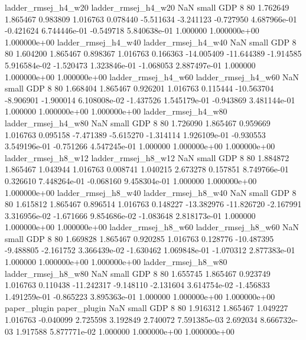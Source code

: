      ladder_rmsej_h4_w20      ladder_rmsej_h4_w20                   NaN      small      GDP                 8 80 1.762649       1.865467 0.983809       1.016763    0.078440     -5.511634     -3.241123    -0.727950   4.687966e-01 -0.421624 6.744446e-01    -0.549718   5.840638e-01            1.000000    1.000000e+00        1.000000e+00
     ladder_rmsej_h4_w40      ladder_rmsej_h4_w40                   NaN      small      GDP                 8 80 1.604200       1.865467 0.898367       1.016763    0.166363    -14.005409    -11.644389    -1.914585   5.916584e-02 -1.520473 1.323846e-01    -1.068053   2.887497e-01            1.000000    1.000000e+00        1.000000e+00
     ladder_rmsej_h4_w60      ladder_rmsej_h4_w60                   NaN      small      GDP                 8 80 1.668404       1.865467 0.926201       1.016763    0.115444    -10.563704     -8.906901    -1.900014   6.108008e-02 -1.437526 1.545179e-01    -0.943869   3.481144e-01            1.000000    1.000000e+00        1.000000e+00
     ladder_rmsej_h4_w80      ladder_rmsej_h4_w80                   NaN      small      GDP                 8 80 1.726090       1.865467 0.959669       1.016763    0.095158     -7.471389     -5.615270    -1.314114   1.926109e-01 -0.930553 3.549196e-01    -0.751266   4.547245e-01            1.000000    1.000000e+00        1.000000e+00
     ladder_rmsej_h8_w12      ladder_rmsej_h8_w12                   NaN      small      GDP                 8 80 1.884872       1.865467 1.043944       1.016763    0.008741      1.040215      2.673278     0.157851   8.749766e-01  0.326610 7.448264e-01    -0.068160   9.458304e-01            1.000000    1.000000e+00        1.000000e+00
     ladder_rmsej_h8_w40      ladder_rmsej_h8_w40                   NaN      small      GDP                 8 80 1.615812       1.865467 0.896514       1.016763    0.148227    -13.382976    -11.826720    -2.167991   3.316956e-02 -1.671666 9.854686e-02    -1.083648   2.818173e-01            1.000000    1.000000e+00        1.000000e+00
     ladder_rmsej_h8_w60      ladder_rmsej_h8_w60                   NaN      small      GDP                 8 80 1.669828       1.865467 0.920285       1.016763    0.128776    -10.487395     -9.488805    -2.161752   3.366439e-02 -1.630462 1.069848e-01    -1.070312   2.877383e-01            1.000000    1.000000e+00        1.000000e+00
     ladder_rmsej_h8_w80      ladder_rmsej_h8_w80                   NaN      small      GDP                 8 80 1.655745       1.865467 0.923749       1.016763    0.110438    -11.242317     -9.148110    -2.131604   3.614754e-02 -1.456833 1.491259e-01    -0.865223   3.895363e-01            1.000000    1.000000e+00        1.000000e+00
            paper_plugin             paper_plugin                   NaN      small      GDP                 8 80 1.916312       1.865467 1.049227       1.016763   -0.040099      2.725598      3.192849     2.740072   7.591385e-03  2.692034 8.666732e-03     1.917588   5.877771e-02            1.000000    1.000000e+00        1.000000e+00